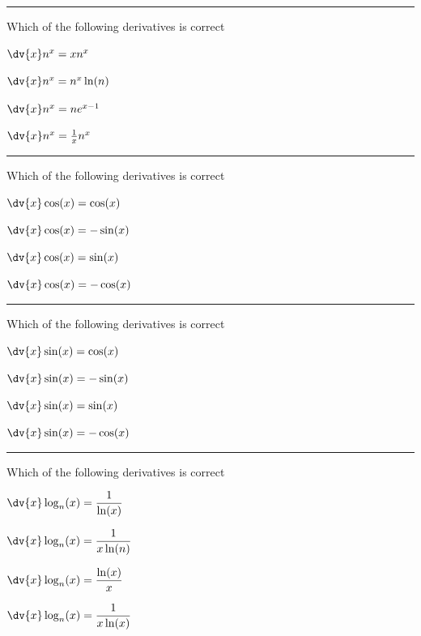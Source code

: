 \begin{preguntas}
\pregunta[4] \rule{1cm}{0.1mm} Which of the following derivatives is correct

\begin{enumerate*}[label=(\alph*)]
    \item \(\dv{x}n^{x} = xn^{x}\) 
    \item \(\dv{x}n^{x} = n^{x}\ln(n)\)
    \item \(\dv{x}n^{x} = ne^{x-1}\)
    \item \(\dv{x}n^{x} = \frac{1}{x}n^{x}\)
\end{enumerate*}

\pregunta[4] \rule{1cm}{0.1mm} Which of the following derivatives is correct

\begin{enumerate*}[label=(\alph*)]
    \item \(\dv{x}\cos(x) = \cos(x)\) 
    \item \(\dv{x}\cos(x) = -\sin(x)\)
    \item \(\dv{x}\cos(x) = \sin(x)\)
    \item \(\dv{x}\cos(x) = -\cos(x)\)
\end{enumerate*}

\pregunta[4] \rule{1cm}{0.1mm} Which of the following derivatives is correct

\begin{enumerate*}[label=(\alph*)]
    \item \(\dv{x}\sin(x) = \cos(x)\) 
    \item \(\dv{x}\sin(x) = -\sin(x)\)
    \item \(\dv{x}\sin(x) = \sin(x)\)
    \item \(\dv{x}\sin(x) = -\cos(x)\)
\end{enumerate*}

\pregunta[4] \rule{1cm}{0.1mm} Which of the following derivatives is correct

\begin{enumerate*}[label=(\alph*)]
    \item \(\dv{x}\log_n(x) = \dfrac{1}{\ln(x)}\) 
    \item \(\dv{x}\log_n(x) = \dfrac{1}{x\ln(n)}\)
    \item \(\dv{x}\log_n(x) = \dfrac{\ln(x)}{x}\)
    \item \(\dv{x}\log_n(x) = \dfrac{1}{x\ln(x)}\)
\end{enumerate*}

\end{preguntas}

